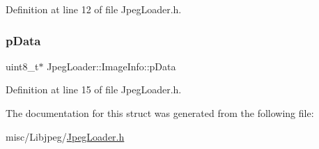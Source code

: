 Definition at line 12 of file Jpeg\+Loader.\+h.

\mbox{\label{structJpegLoader_1_1ImageInfo_ab34777b5fdc4ab2b67ca9e2ca665a558}} 
\subsubsection{\texorpdfstring{pData}{pData}}
{\footnotesize\ttfamily uint8\+\_\+t$\ast$ Jpeg\+Loader\+::\+Image\+Info\+::p\+Data}



Definition at line 15 of file Jpeg\+Loader.\+h.



The documentation for this struct was generated from the following file\+:\begin{DoxyCompactItemize}
\item 
misc/\+Libjpeg/\mbox{\hyperlink{JpegLoader_8h}{Jpeg\+Loader.\+h}}\end{DoxyCompactItemize}
